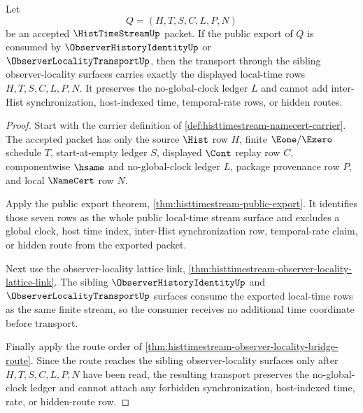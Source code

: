 \begin{theorem}
\label{thm:histtimestream-observer-locality-transport}
Let
$$
Q=(H,T,S,C,L,P,N)
$$
be an accepted $\HistTimeStreamUp$ packet. If the public export of $Q$ is consumed by $\ObserverHistoryIdentityUp$ or $\ObserverLocalityTransportUp$, then the transport through the sibling observer-locality surfaces carries exactly the displayed local-time rows $H,T,S,C,L,P,N$. It preserves the no-global-clock ledger $L$ and cannot add inter-Hist synchronization, host-indexed time, temporal-rate rows, or hidden routes.
\end{theorem}
\begin{proof}
Start with the carrier definition of \autoref{def:histtimestream-namecert-carrier}. The accepted packet has only the source $\Hist$ row $H$, finite $\Eone/\Ezero$ schedule $T$, start-at-empty ledger $S$, displayed $\Cont$ replay row $C$, componentwise $\hsame$ and no-global-clock ledger $L$, package provenance row $P$, and local $\NameCert$ row $N$.

Apply the public export theorem, \autoref{thm:histtimestream-public-export}. It identifies those seven rows as the whole public local-time stream surface and excludes a global clock, host time index, inter-Hist synchronization row, temporal-rate claim, or hidden route from the exported packet.

Next use the observer-locality lattice link, \autoref{thm:histtimestream-observer-locality-lattice-link}. The sibling $\ObserverHistoryIdentityUp$ and $\ObserverLocalityTransportUp$ surfaces consume the exported local-time rows as the same finite stream, so the consumer receives no additional time coordinate before transport.

Finally apply the route order of \autoref{thm:histtimestream-observer-locality-bridge-route}. Since the route reaches the sibling observer-locality surfaces only after $H,T,S,C,L,P,N$ have been read, the resulting transport preserves the no-global-clock ledger and cannot attach any forbidden synchronization, host-indexed time, rate, or hidden-route row.
\end{proof}

